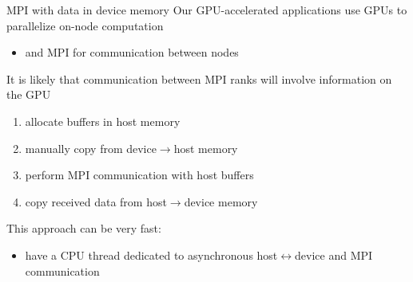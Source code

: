 
\begin{frame}[fragile]{}
    \begin{info}{MPI with data in device memory}
        Our GPU-accelerated applications use GPUs to parallelize on-node computation
        \begin{itemize}
            \item and MPI for communication between nodes
        \end{itemize}
        It is likely that communication between MPI ranks will involve information on the GPU
        \begin{enumerate}
            \item allocate buffers in host memory
            \item manually copy from device$\rightarrow$host memory
            \item perform MPI communication with host buffers
            \item copy received data from host$\rightarrow$device memory
        \end{enumerate}
        This approach can be very fast:
        \begin{itemize}
            \item have a CPU thread dedicated to asynchronous host$\leftrightarrow$device and MPI communication
        \end{itemize}
    \end{info}

\end{frame}

